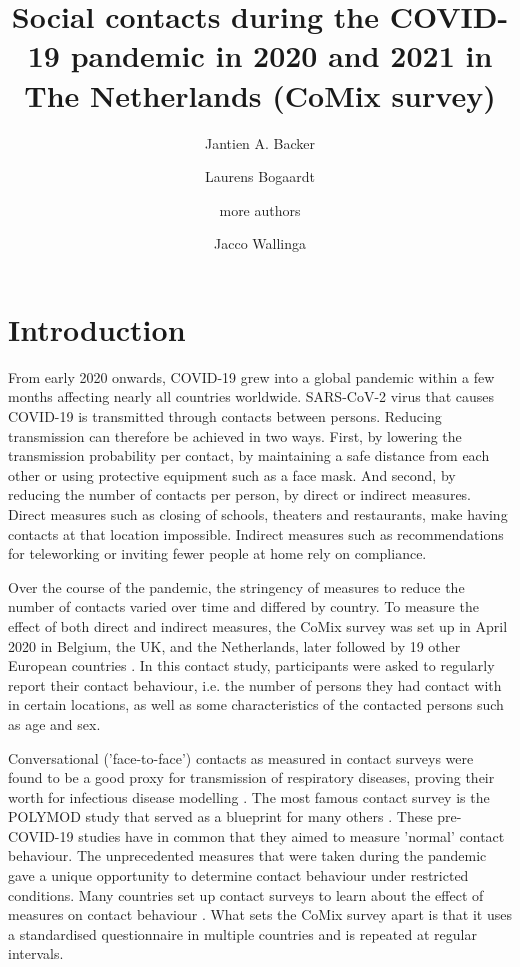 \documentclass[fleqn,10pt]{wlscirep}
\title{Social contacts during the COVID-19 pandemic in 2020 and 2021 in The Netherlands (CoMix survey)}
\author[1,*]{Jantien A. Backer}
\author[1]{Laurens Bogaardt}
\author[?]{more authors}
\author[1,2]{Jacco Wallinga}
\affil[1]{National Institute for Public Health and the Environment, Bilthoven, the Netherlands}
\affil[2]{Leiden University Medical Center, Leiden, the Netherlands}
\affil[*]{jantien.backer@rivm.nl}
\begin{document}
\flushbottom
\maketitle

\thispagestyle{empty}


\section*{Introduction}
From early 2020 onwards, COVID-19 grew into a global pandemic within a few months affecting nearly all countries worldwide. SARS-CoV-2 virus that causes COVID-19 is transmitted through contacts between persons. Reducing transmission can therefore be achieved in two ways. First, by lowering the transmission probability per contact, by maintaining a safe distance from each other or using protective equipment such as a face mask. And second, by reducing the number of contacts per person, by direct or indirect measures. Direct measures such as closing of schools, theaters and restaurants, make having contacts at that location impossible. Indirect measures such as recommendations for teleworking or inviting fewer people at home rely on compliance.

Over the course of the pandemic, the stringency of measures to reduce the number of contacts varied over time and differed by country. To measure the effect of both direct and indirect measures, the CoMix survey was set up in April 2020 in Belgium, the UK, and the Netherlands, later followed by 19 other European countries \cite{Verelst_2021}. In this contact study, participants were asked to regularly report their contact behaviour, i.e. the number of persons they had contact with in certain locations, as well as some characteristics of the contacted persons such as age and sex. 

Conversational ('face-to-face') contacts as measured in contact surveys were found to be a good proxy for transmission of respiratory diseases, proving their worth for infectious disease modelling  \cite{Wallinga_2006}. The most famous contact survey is the POLYMOD study \cite{Mossong_2008} that served as a blueprint for many others \cite{Hoang_2019}. These pre-COVID-19 studies have in common that they aimed to measure 'normal' contact behaviour. The unprecedented measures that were taken during the pandemic gave a unique opportunity to determine contact behaviour under restricted conditions. Many countries set up contact surveys to learn about the effect of measures on contact behaviour \cite{Zhang_2020, Latsuzbaia_2020, Quaife_2020, Backer_2021, Bosetti_2021, Feehan_2021, Tomori_2021, Drolet_2022}. What sets the CoMix survey apart is that it uses a standardised questionnaire in multiple countries and is repeated at regular intervals.
\end{document}
